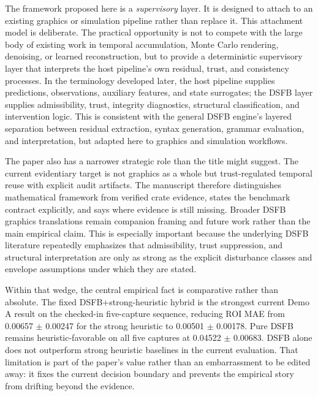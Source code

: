 \documentclass[11pt]{article}
\theoremstyle{definition}
\theoremstyle{plain}
\begin{document}
The framework proposed here is a \emph{supervisory} layer. It is designed to attach to an existing graphics or simulation pipeline rather than replace it. This attachment model is deliberate. The practical opportunity is not to compete with the large body of existing work in temporal accumulation, Monte Carlo rendering, denoising, or learned reconstruction, but to provide a deterministic supervisory layer that interprets the host pipeline's own residual, trust, and consistency processes. In the terminology developed later, the host pipeline supplies predictions, observations, auxiliary features, and state surrogates; the DSFB layer supplies admissibility, trust, integrity diagnostics, structural classification, and intervention logic. This is consistent with the general DSFB engine’s layered separation between residual extraction, syntax generation, grammar evaluation, and interpretation, but adapted here to graphics and simulation workflows. 

The paper also has a narrower strategic role than the title might suggest. The current evidentiary target is not graphics as a whole but trust-regulated temporal reuse with explicit audit artifacts. The manuscript therefore distinguishes mathematical framework from verified crate evidence, states the benchmark contract explicitly, and says where evidence is still missing. Broader DSFB graphics translations remain companion framing and future work rather than the main empirical claim. This is especially important because the underlying DSFB literature repeatedly emphasizes that admissibility, trust suppression, and structural interpretation are only as strong as the explicit disturbance classes and envelope assumptions under which they are stated. 

Within that wedge, the central empirical fact is comparative rather than absolute. The fixed DSFB+strong-heuristic hybrid is the strongest current Demo A result on the checked-in five-capture sequence, reducing ROI MAE from 0.00657 $\pm$ 0.00247 for the strong heuristic to 0.00501 $\pm$ 0.00178. Pure DSFB remains heuristic-favorable on all five captures at 0.04522 $\pm$ 0.00683. DSFB alone does not outperform strong heuristic baselines in the current evaluation. That limitation is part of the paper's value rather than an embarrassment to be edited away: it fixes the current decision boundary and prevents the empirical story from drifting beyond the evidence.

\end{document}
